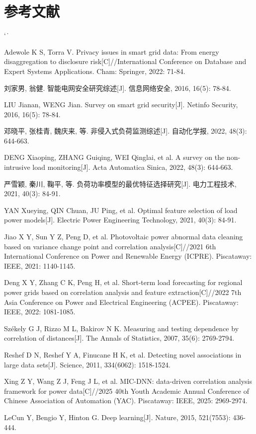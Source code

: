 \documentclass[UTF8,zihao=5,twoside]{ctexart}
\makeatletter
\numberwithin{equation}{section}
\renewcommand{\refname}{参考文献}
\renewenvironment{thebibliography}[1]{%
  \section*{\refname}%
  \small
  \list{[\arabic{enumi}]}{%
    \settowidth\labelwidth{[#1]}%
    \leftmargin\labelwidth
    \advance\leftmargin\labelsep
    \usecounter{enumi}}
  \sloppy\clubpenalty4000\widowpenalty4000\sfcode`\.\ \@m
}{\def\@noitemerr{\@latex@warning{Empty `thebibliography' environment}}\endlist}
\makeatother
\begin{document}
\begin{thebibliography}{99}
Adewole K S, Torra V. Privacy issues in smart grid data: From energy disaggregation to disclosure risk[C]//International Conference on Database and Expert Systems Applications. Cham: Springer, 2022: 71-84.

刘家男, 翁健. 智能电网安全研究综述[J]. 信息网络安全, 2016, 16(5): 78-84.

LIU Jianan, WENG Jian. Survey on smart grid security[J]. Netinfo Security, 2016, 16(5): 78-84.

邓晓平, 张桂青, 魏庆来, 等. 非侵入式负荷监测综述[J]. 自动化学报, 2022, 48(3): 644-663.

DENG Xiaoping, ZHANG Guiqing, WEI Qinglai, et al. A survey on the non-intrusive load monitoring[J]. Acta Automatica Sinica, 2022, 48(3): 644-663.

严雪颖, 秦川, 鞠平, 等. 负荷功率模型的最优特征选择研究[J]. 电力工程技术, 2021, 40(3): 84-91.

YAN Xueying, QIN Chuan, JU Ping, et al. Optimal feature selection of load power models[J]. Electric Power Engineering Technology, 2021, 40(3): 84-91.

Jiao X Y, Sun Y Z, Peng D, et al. Photovoltaic power abnormal data cleaning based on variance change point and correlation analysis[C]//2021 6th International Conference on Power and Renewable Energy (ICPRE). Piscataway: IEEE, 2021: 1140-1145.

Deng X Y, Zhang C K, Peng H, et al. Short-term load forecasting for regional power grids based on correlation analysis and feature extraction[C]//2022 7th Asia Conference on Power and Electrical Engineering (ACPEE). Piscataway: IEEE, 2022: 1081-1085.

Székely G J, Rizzo M L, Bakirov N K. Measuring and testing dependence by correlation of distances[J]. The Annals of Statistics, 2007, 35(6): 2769-2794.

Reshef D N, Reshef Y A, Finucane H K, et al. Detecting novel associations in large data sets[J]. Science, 2011, 334(6062): 1518-1524.

Xing Z Y, Wang Z J, Feng J L, et al. MIC-DNN: data-driven correlation analysis framework for power data[C]//2025 40th Youth Academic Annual Conference of Chinese Association of Automation (YAC). Piscataway: IEEE, 2025: 2969-2974.

LeCun Y, Bengio Y, Hinton G. Deep learning[J]. Nature, 2015, 521(7553): 436-444.


\end{thebibliography}
\end{document}
